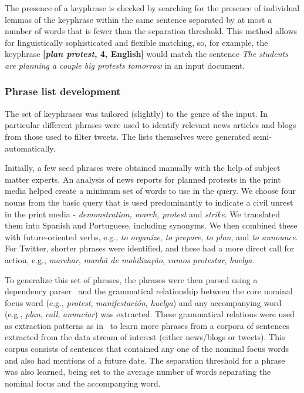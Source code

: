\documentclass[letterpaper]{article}
\begin{document}
The presence of a keyphrase is checked by searching for the presence of
individual lemmas of the keyphrase within the same sentence separated
by at most a number of words that is fewer than the separation
threshold.  This method allows for linguistically sophisticated and
flexible matching, so, for example, the keyphrase {\bf [{\em plan
protest}, 4, English]} would match the sentence {\em The students are
planning a couple big protests tomorrow} in an input document.

\subsubsection{Phrase list development}
\label{sec:phraselearning}
The set of keyphrases was tailored (slightly) to the genre of the
input. In particular different phrases were used to identify relevant
news articles and blogs from those used to filter tweets.  The lists
themselves were generated semi-automatically.

Initially, a few seed phrases were obtained manually with the help of
subject matter experts.  An analysis of news reports for planned
protests in the print media helped create a minimum set of words to use
in the query.  We choose four nouns from the basic query that is used
predominantly to indicate a civil unrest in the print media - {\em
demonstration, march, protest} and {\it strike}. We translated them into
Spanish and Portuguese, including synonyms.  We then combined these with
future-oriented verbs, e.g., {\em to organize}, {\em to prepare}, {\em
to plan}, and {\em to announce}. For Twitter, shorter phrases were
identified, and these had a more direct call for action, e.g., {\em
marchar}, {\em manhã de mobilização}, {\em vamos protestar}, {\em
huelga}.

To generalize this set of phrases, the phrases were then parsed
using a dependency parser~\cite{freeling} and the grammatical
relationship between the core nominal focus word (e.g., {\em protest}, 
{\em manifestación}, {\em huelga}) and any accompanying
word (e.g., {\em plan}, {\em call}, {\em anunciar}) was
extracted. These grammatical relations were used as extraction
patterns as in~\cite{riloff2003learning} to learn more phrases from a
corpora of sentences extracted from the data stream of interest
(either news/blogs or tweets). This corpus consists of sentences that
contained any one of the nominal focus words and also had mentions of
a future date. The separation threshold for a phrase was also
learned, being set to the average number of words separating
the nominal focus and the accompanying word.
\end{document}
